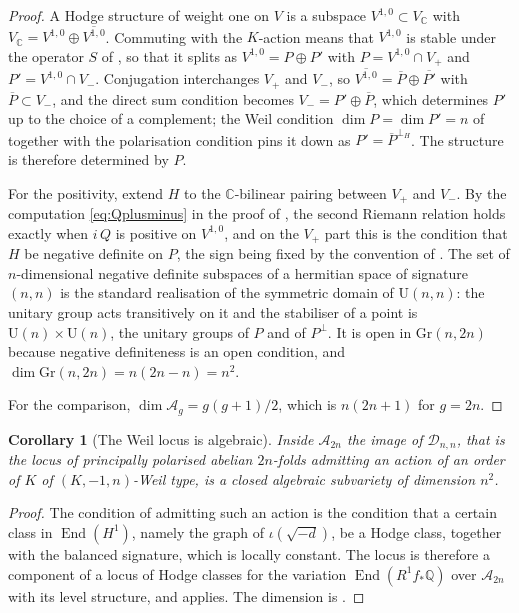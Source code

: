 \documentclass[11pt,reqno]{amsart}
\theoremstyle{plain}
\newtheorem{corollary}[theorem]{Corollary}
\theoremstyle{definition}
\theoremstyle{remark}
\newcommand{\QQ}{\mathbb{Q}}
\newcommand{\CC}{\mathbb{C}}
\newcommand{\cA}{\mathcal{A}}
\newcommand{\cD}{\mathcal{D}}
\DeclareMathOperator{\End}{End}
\newcommand{\bbar}[1]{\overline{#1}}
\begin{document}
\begin{proof}
A Hodge structure of weight one on $V$ is a subspace $V^{1,0}\subset V_{\CC}$
with $V_{\CC}=V^{1,0}\oplus\overline{V^{1,0}}$. Commuting with the $K$-action
means that $V^{1,0}$ is stable under the operator $S$ of ,
so that it splits as $V^{1,0}=P\oplus P'$ with $P=V^{1,0}\cap V_{+}$ and
$P'=V^{1,0}\cap V_{-}$.
Conjugation interchanges $V_{+}$ and $V_{-}$, so
$\overline{V^{1,0}}=\bbar{P}\oplus\bbar{P'}$ with $\bbar{P}\subset V_{-}$, and
the direct sum condition becomes $V_{-}=P'\oplus\bbar{P}$, which determines
$P'$ up to the choice of a complement; the Weil condition
$\dim P=\dim P'=n$ of  together with the polarisation
condition pins it down as $P'=\bbar{P}^{\perp_{H}}$. The structure is
therefore determined by $P$.

For the positivity, extend $H$ to the $\CC$-bilinear pairing between $V_{+}$
and $V_{-}$. By the computation \eqref{eq:Qplusminus} in the proof of
, the second Riemann relation holds exactly when $i\,Q$ is
positive on $V^{1,0}$, and on the $V_{+}$ part this is the condition that $H$
be negative definite on $P$, the sign being fixed by the convention of
. The set of $n$-dimensional negative definite subspaces
of a hermitian space of signature $(n,n)$ is the standard realisation of the
symmetric domain of $\mathrm{U}(n,n)$: the unitary group acts transitively on
it and the stabiliser of a point is $\mathrm{U}(n)\times\mathrm{U}(n)$, the
unitary groups of $P$ and of $P^{\perp}$. It is open in $\mathrm{Gr}(n,2n)$
because negative definiteness is an open condition, and
$\dim\mathrm{Gr}(n,2n)=n(2n-n)=n^{2}$.

For the comparison, $\dim\cA_{g}=g(g+1)/2$, which is $n(2n+1)$ for $g=2n$.
\end{proof}

\begin{corollary}[The Weil locus is algebraic]\label{cor:weilalgebraic}
Inside $\cA_{2n}$ the image of $\cD_{n,n}$, that is the locus of principally
polarised abelian $2n$-folds admitting an action of an order of $K$ of
$(K,-1,n)$-Weil type, is a closed algebraic subvariety of dimension $n^{2}$.
\end{corollary}

\begin{proof}
The condition of admitting such an action is the condition that a certain
class in $\End(H^{1})$, namely the graph of $\iota(\sqrt{-d})$, be a Hodge
class, together with the balanced signature, which is locally constant. The
locus is therefore a component of a locus of Hodge classes for the variation
$\End(R^{1}f_{*}\QQ)$ over $\cA_{2n}$ with its level structure, and
 applies. The dimension is .
\end{proof}
\end{document}

